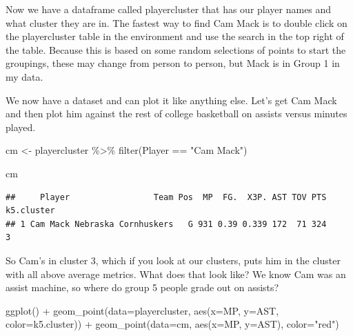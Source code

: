 \documentclass[
]{book}
\newenvironment{Shaded}{\begin{snugshade}}{\end{snugshade}}
\newcommand{\AttributeTok}[1]{\textcolor[rgb]{0.77,0.63,0.00}{#1}}
\newcommand{\FunctionTok}[1]{\textcolor[rgb]{0.00,0.00,0.00}{#1}}
\newcommand{\NormalTok}[1]{#1}
\newcommand{\OtherTok}[1]{\textcolor[rgb]{0.56,0.35,0.01}{#1}}
\newcommand{\SpecialCharTok}[1]{\textcolor[rgb]{0.00,0.00,0.00}{#1}}
\newcommand{\StringTok}[1]{\textcolor[rgb]{0.31,0.60,0.02}{#1}}
\begin{document}
\begin{Shaded}
\end{Shaded}

Now we have a dataframe called playercluster that has our player names and what cluster they are in. The fastest way to find Cam Mack is to double click on the playercluster table in the environment and use the search in the top right of the table. Because this is based on some random selections of points to start the groupings, these may change from person to person, but Mack is in Group 1 in my data.

We now have a dataset and can plot it like anything else. Let's get Cam Mack and then plot him against the rest of college basketball on assists versus minutes played.

\begin{Shaded}
\begin{Highlighting}[]
\NormalTok{cm }\OtherTok{\textless{}{-}}\NormalTok{ playercluster }\SpecialCharTok{\%\textgreater{}\%} \FunctionTok{filter}\NormalTok{(Player }\SpecialCharTok{==} \StringTok{"Cam Mack"}\NormalTok{)}

\NormalTok{cm}
\end{Highlighting}
\end{Shaded}

\begin{verbatim}
##     Player                 Team Pos  MP  FG.  X3P. AST TOV PTS k5.cluster
## 1 Cam Mack Nebraska Cornhuskers   G 931 0.39 0.339 172  71 324          3
\end{verbatim}

So Cam's in cluster 3, which if you look at our clusters, puts him in the cluster with all above average metrics. What does that look like? We know Cam was an assist machine, so where do group 5 people grade out on assists?

\begin{Shaded}
\begin{Highlighting}[]
\FunctionTok{ggplot}\NormalTok{() }\SpecialCharTok{+} 
  \FunctionTok{geom\_point}\NormalTok{(}\AttributeTok{data=}\NormalTok{playercluster, }\FunctionTok{aes}\NormalTok{(}\AttributeTok{x=}\NormalTok{MP, }\AttributeTok{y=}\NormalTok{AST, }\AttributeTok{color=}\NormalTok{k5.cluster)) }\SpecialCharTok{+} 
  \FunctionTok{geom\_point}\NormalTok{(}\AttributeTok{data=}\NormalTok{cm, }\FunctionTok{aes}\NormalTok{(}\AttributeTok{x=}\NormalTok{MP, }\AttributeTok{y=}\NormalTok{AST), }\AttributeTok{color=}\StringTok{"red"}\NormalTok{)}
\end{Highlighting}
\end{Shaded}
\end{document}
